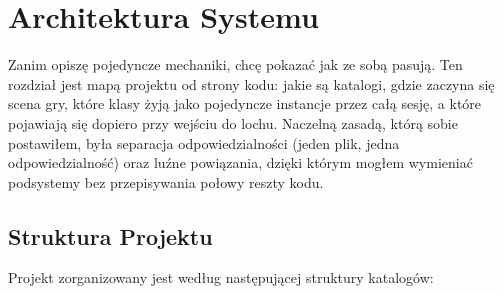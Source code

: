 \chapter{Architektura Systemu}

Zanim opiszę pojedyncze mechaniki, chcę pokazać jak ze sobą pasują. Ten rozdział jest mapą projektu od strony kodu: jakie są katalogi, gdzie zaczyna się scena gry, które klasy żyją jako pojedyncze instancje przez całą sesję, a które pojawiają się dopiero przy wejściu do lochu. Naczelną zasadą, którą sobie postawiłem, była separacja odpowiedzialności (jeden plik, jedna odpowiedzialność) oraz luźne powiązania, dzięki którym mogłem wymieniać podsystemy bez przepisywania połowy reszty kodu.

\section{Struktura Projektu}

Projekt zorganizowany jest według następującej struktury katalogów:

